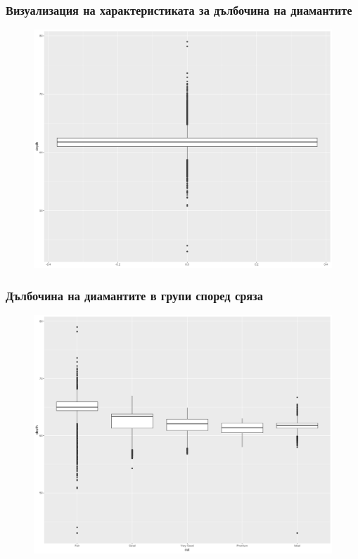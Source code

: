 \documentclass{beamer}
\begin{document}
\begin{frame}
\frametitle{Визуализация на характеристиката за дълбочина на диамантите}
\begin{figure}[]\includegraphics[width=\textwidth,height=0.75\textheight]{pic0037}\end{figure}
\end{frame}

\begin{frame}
\frametitle{Дълбочина на диамантите в групи според сряза}
\begin{figure}[]\includegraphics[width=\textwidth,height=0.75\textheight]{pic0038}\end{figure}
\end{frame}
\end{document}

